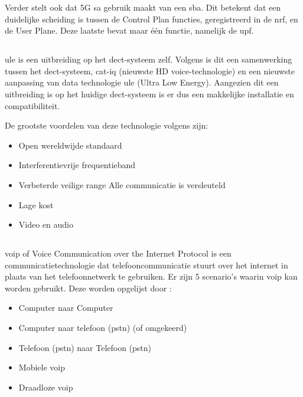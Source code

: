 Verder stelt \textcite{Lee2025a} ook dat 5G \gls{sa} gebruik maakt van een \gls{sba}. Dit betekent dat een duidelijke scheiding is tussen de Control Plan functies, geregistreerd in de \gls{nrf}, en de User Plane. Deze laatste bevat maar \'e\'en functie, namelijk de \gls{upf}.


\subsection{}%
\label{sec:ule}%

\gls{ule} is een uitbreiding op het \gls{dect}-systeem zelf. Volgens \textcite{GariniDil2014} is dit een samenwerking tussen het \gls{dect}-systeem, \gls{cat-iq} (nieuwste HD voice-technologie) en een nieuwste aanpassing van data technologie \gls{ule} (Ultra Low Energy). Aangezien dit een uitbreiding is op het huidige \gls{dect}-systeem is er dus een makkelijke installatie en compatibiliteit.

De grootste voordelen van deze technologie volgens \textcite{GariniDil2014} zijn:

\begin{itemize}
  \item Open wereldwijde standaard
  \item Interferentievrije frequentieband
  \item Verbeterde veilige range
  \subitem Alle communicatie is versleuteld
  \item Lage kost
  \item Video en audio
\end{itemize}




\subsection{}%
\label{sec:voip}%

\gls{voip} of Voice Communication over the Internet Protocol is een communicatietechnologie dat telefooncommunicatie stuurt over het internet in plaats van het telefoonnetwerk te gebruiken. \Autocite{Soenmez2018} Er zijn 5 scenario's waarin \gls{voip} kan worden gebruikt. Deze worden opgelijst door \textcite{Soenmez2018}:

\begin{itemize}
  \item Computer naar Computer
  \item Computer naar telefoon (\gls{pstn}) (of omgekeerd)
  \item Telefoon (\gls{pstn}) naar Telefoon (\gls{pstn})
  \item Mobiele \gls{voip}
  \item Draadloze \gls{voip}
\end{itemize}

